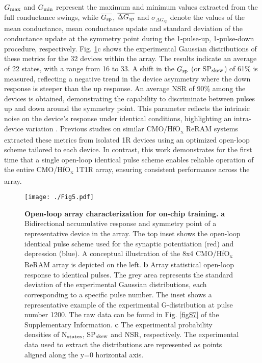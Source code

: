 $G_{\rm max}$ and $G_{\rm min}$ represent the maximum and minimum values extracted from the full conductance swings, while $\overline{G_{\rm sp}}$, $\overline{\Delta G_{\rm sp}}$ and $\sigma_{\Delta G_{sp}}$ denote the values of the mean conductance, mean conductance update and standard deviation of the conductance update at the symmetry point during the 1-pulse-up, 1-pulse-down procedure, respectively. Fig. \ref{fig5}c shows the experimental Gaussian distributions of these metrics for the 32 devices within the array. The results indicate an average of 22 states, with a range from 16 to 33. A shift in the $G_{\rm sp}$ (or SP$_{\rm skew}$) of 61\% is measured, reflecting a negative trend in the device asymmetry where the down response is steeper than the up response. An average NSR of 90\% among the devices is obtained, demonstrating the capability to discriminate between pulses up and down around the symmetry point. This parameter reflects the intrinsic noise on the device's response under identical conditions, highlighting an intra-device variation \cite{aihwkit}. Previous studies on similar CMO/HfO\textsubscript{\textnormal{x}} ReRAM systems \cite{Stecconi2024} extracted these metrics from isolated 1R devices using an optimized open-loop scheme tailored to each device. In contrast, this work demonstrates for the first time that a single open-loop identical pulse scheme enables reliable operation of the entire CMO/HfO\textsubscript{\textnormal{x}} 1T1R array, ensuring consistent performance across the array.
\begin{figure}[H]
\centering
\texttt{[image: ./Fig5.pdf]}
\caption{\textbf{Open-loop array characterization for on-chip training.} \textbf{a} Bidirectional accumulative response and symmetry point of a representative device in the array. The top inset shows the open-loop identical pulse scheme used for the synaptic potentiation (red) and depression (blue). A conceptual illustration of the 8x4 CMO/HfO\textsubscript{\textnormal{x}} ReRAM array is depicted on the left. \textbf{b} Array statistical open-loop response to identical pulses. The grey area represents the standard deviation of the experimental Gaussian distributions, each corresponding to a specific pulse number. The inset shows a representative example of the experimental G-distribution at pulse number 1200. The raw data can be found in Fig. \ref{figS7} of the Supplementary Information. \textbf{c} The experimental probability densities of N$_{\rm states}$, SP$_{\rm skew}$ and NSR, respectively. The experimental data used to extract the distributions are represented as points aligned along the y=0 horizontal axis.}
\label{fig5}
\end{figure}

